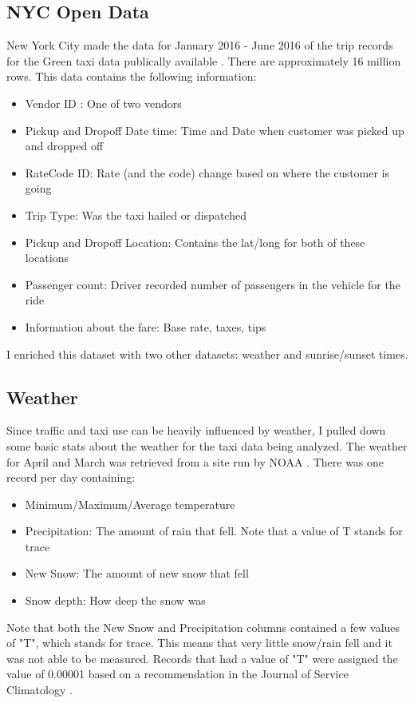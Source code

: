 \documentclass[conference]{IEEEtran}
\begin{document}
\subsection{NYC Open Data}
New York City made the data for January 2016 - June 2016 of the trip records for the Green taxi data publically available \cite{green2016}. There are approximately 16 million rows.  This data contains the following information:
\begin{itemize}
\item{Vendor ID : One of two vendors}
\item{Pickup and Dropoff Date time: Time and Date when customer was picked up and dropped off}
\item{RateCode ID: Rate (and the code) change based on where the customer is going}
\item{Trip Type: Was the taxi hailed or dispatched}
\item{Pickup and Dropoff Location: Contains the lat/long for both of these locations}
\item{Passenger count: Driver recorded number of passengers in the vehicle for the ride}
\item{Information about the fare: Base rate, taxes, tips}
\end{itemize}

I enriched this dataset with two other datasets: weather and sunrise/sunset times.

\subsection{Weather}
Since traffic and taxi use can be heavily influenced by weather, I pulled down some basic stats about the weather for the taxi data being analyzed. The weather for April and March was retrieved from a site run by NOAA \cite{weather}.  There was one record per day containing:
 \begin{itemize}
\item{Minimum/Maximum/Average temperature}
\item{Precipitation: The amount of rain that fell.  Note that a value of T stands for trace}
\item{New Snow: The amount of new snow that fell}
\item{Snow depth: How deep the snow was}
\end{itemize}
Note that both the New Snow and Precipitation columns contained a few values of "T", which stands for trace.  This means that very little snow/rain fell and it was not able to be measured.  Records that had a value of "T" were assigned the value of 0.00001 based on a recommendation in the Journal of Service Climatology \cite{trace}.
\end{document}
